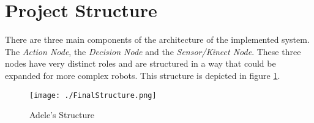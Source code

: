 \section{Project Structure}

There are three main components of the architecture of the implemented system. The \textit{Action Node}, the \textit{Decision Node} and the \textit{Sensor/Kinect Node}. These three nodes have very distinct roles and are structured in a way that could be expanded for more complex robots. This structure is depicted in figure \ref{fig:adele_structure}.

\begin{figure}[!ht]
    \centering
    \texttt{[image: ./FinalStructure.png]}
    \caption{Adele's Structure}
    \label{fig:adele_structure}
\end{figure}




